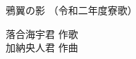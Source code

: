 \documentclass[10pt,b5j]{tarticle} %
\begin{document}
\begin{minipage}[c]{0.7\hsize} %
    \begin{center}
        {\LARGE
            鴉翼の影 %
        }
        {\small 
            （令和二年度寮歌） %
        }
    \end{center}
\end{minipage}
\begin{minipage}[c]{0.3\hsize} %
    \begin{flushright} %
        落合海宇君 作歌\\加納央人君 作曲 %
    \end{flushright}
\end{minipage}
\end{document}

